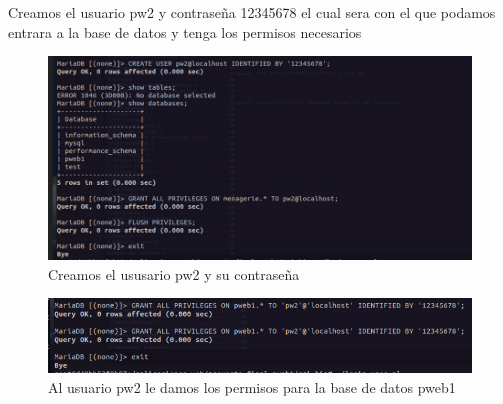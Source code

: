Creamos el usuario pw2 y contraseña 12345678 el cual sera con el que podamos entrara a la base de datos y tenga los permisos necesarios
\begin{figure}[H]
  \centering
  \includegraphics[width=1.0\textwidth]{img/Creamos_usuario_MariaDB.png}
  \caption{Creamos el ususario pw2 y su contraseña}
\end{figure}
\begin{figure}[H]
  \centering
  \includegraphics[width=1.0\textwidth]{img/Dando_Permisos.png}
  \caption{Al usuario pw2 le damos los permisos para la base de datos pweb1}
\end{figure}

